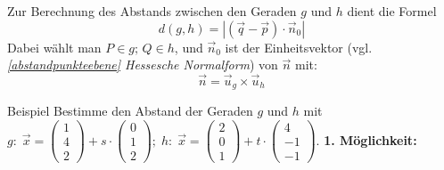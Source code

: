 \documentclass{article}
\begin{document}
    Zur Berechnung des Abstands zwischen den Geraden $g$ und $h$ dient die Formel
    \[d(g,h) = |(\vec{q}-\vec{p})\cdot \vec{n}_0|\]
    Dabei wählt man $P \in g;\, Q \in h$, und $\vec{n}_0$ ist der Einheitsvektor 
    (vgl. \textit{\ref*{abstandpunkteebene} Hessesche Normalform}) von $\vec{n}$
    mit:
    \[\vec{n} = \vec{u}_g \times \vec{u}_h\]
\begin{boxx}[DarkBlue]{Beispiel}
    Bestimme den Abstand der Geraden $g$ und $h$ mit 
    $\displaystyle g:\;\vec{x} = \begin{pmatrix}1\\4\\2\end{pmatrix} + s\cdot \begin{pmatrix}0\\1\\2\end{pmatrix};\;h:\; \vec{x} = \begin{pmatrix}2\\0\\1\end{pmatrix} + t \cdot \begin{pmatrix}4\\-1\\-1\end{pmatrix}$.
    \textbf{1. Möglichkeit:}


\end{boxx}
\end{document}
